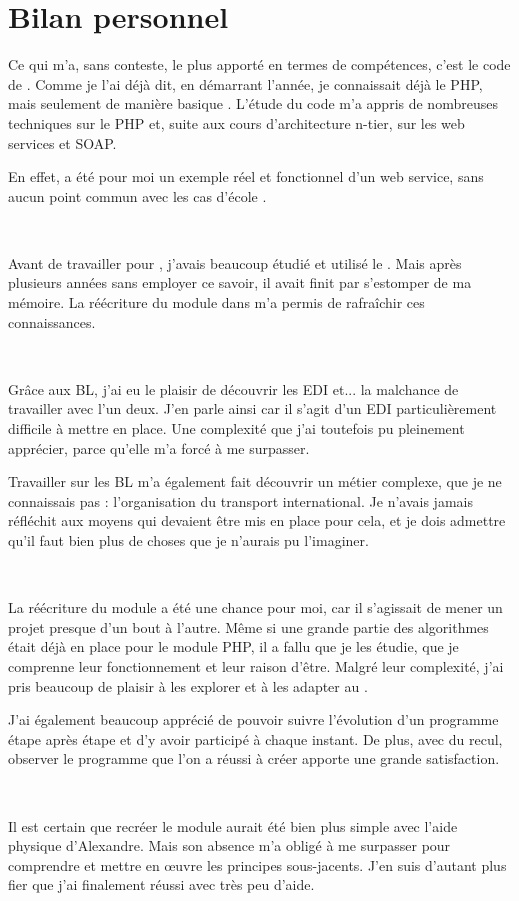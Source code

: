 \chapter{Bilan personnel}
Ce qui m'a, sans conteste, le plus apporté en termes de compétences, c'est le code de \pireus. Comme je l'ai déjà dit, en démarrant l'année, je connaissait déjà le PHP, mais seulement de manière \og basique \fg. L'étude du code m'a appris de nombreuses techniques sur le PHP et, suite aux cours d'architecture n-tier, sur les web services et SOAP.

En effet, \pireus{} a été pour moi un exemple réel et fonctionnel d'un web service, sans aucun point commun avec les \og cas d'école \fg.

~

Avant de travailler pour \solulog, j'avais beaucoup étudié et utilisé le \vb. Mais après plusieurs années sans employer ce savoir, il avait finit par s'estomper de ma mémoire. La réécriture du module dans \integrale{} m'a permis de rafraîchir ces connaissances.

~

Grâce aux BL, j'ai eu le plaisir de découvrir les EDI et... la malchance de travailler avec l'un deux. J'en parle ainsi car il s'agit d'un EDI particulièrement difficile à mettre en place. Une complexité que j'ai toutefois pu pleinement apprécier, parce qu'elle m'a forcé à me surpasser.

Travailler sur les BL m'a également fait découvrir un métier complexe, que je ne connaissais pas : l'organisation du transport international. Je n'avais jamais réfléchit aux moyens qui devaient être mis en place pour cela, et je dois admettre qu'il faut bien plus de choses que je n'aurais pu l'imaginer.

~

La réécriture du module a été une chance pour moi, car il s'agissait de mener un projet presque d'un bout à l'autre. Même si une grande partie des algorithmes était déjà en place pour le module PHP, il a fallu que je les étudie, que je comprenne leur fonctionnement et leur raison d'être. Malgré leur complexité, j'ai pris beaucoup de plaisir à les explorer et à les adapter au \vb.

J'ai également beaucoup apprécié de pouvoir suivre l'évolution d'un programme étape après étape et d'y avoir participé à chaque instant. De plus, avec du recul, observer le programme que l'on a réussi à créer apporte une grande satisfaction.

~

Il est certain que recréer le module aurait été bien plus simple avec l'aide physique d'Alexandre. Mais son absence m'a obligé à me surpasser pour comprendre et mettre en \oe{uvre} les principes sous-jacents. J'en suis d'autant plus fier que j'ai finalement réussi avec très peu d'aide.